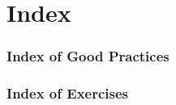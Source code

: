 \documentclass[compress]{beamer}
\begin{document}
\section*{Index}

\begin{frame}
  \frametitle{Index of Good Practices}
  \listofgoodpractices
\end{frame}

\begin{frame}
  \frametitle{Index of Exercises}
  \listofexercises
\end{frame}
\end{document}
